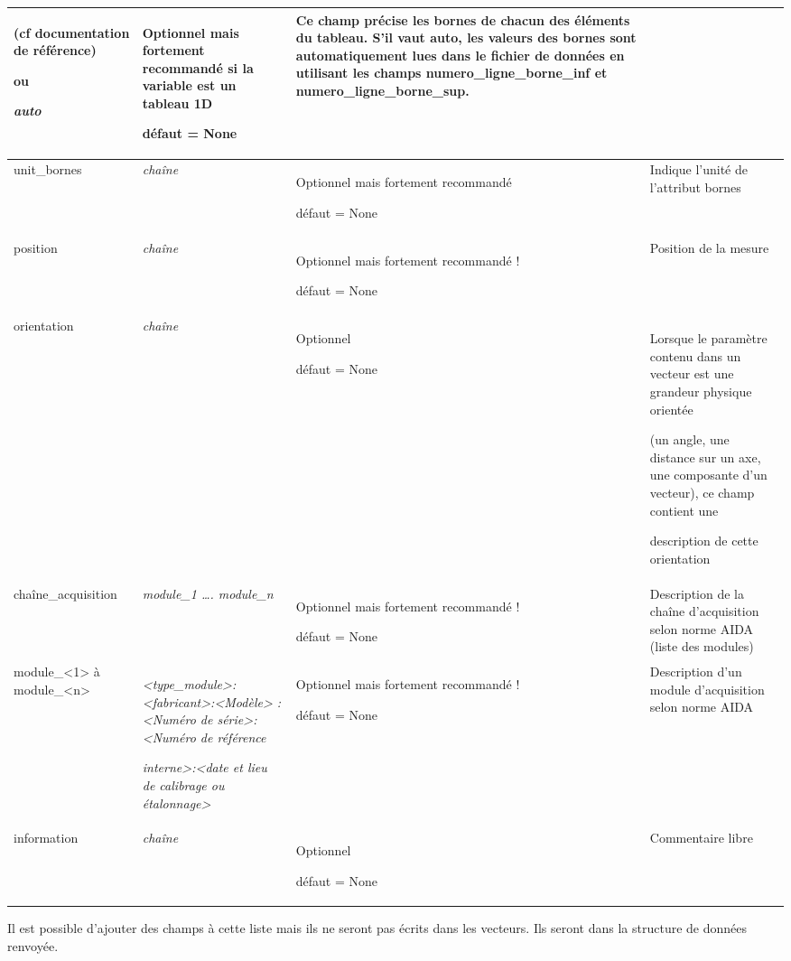 {\begin{center}
\begin{supertabular}{|p{2.9099998cm}|p{3.783cm}|p{4.058cm}|p{4.4500003cm}|}
(cf documentation de référence)

ou

{\itshape auto}&
Optionnel mais fortement recommandé si la variable est un tableau 1D

défaut = None &
Ce champ précise les bornes de chacun des éléments du tableau. S'il vaut auto, les valeurs des bornes sont automatiquement lues dans le fichier de données en utilisant les champs numero\_ligne\_borne\_inf et numero\_ligne\_borne\_sup.\\\hline
unit\_bornes &
{\itshape chaîne} &
Optionnel mais fortement recommandé

défaut = None &
Indique l'unité de l'attribut bornes\\\hline
position &
{\itshape chaîne} &
Optionnel mais fortement recommandé !

défaut = None &
Position de la mesure\\\hline
orientation &
{\itshape chaîne} &
Optionnel

défaut = None &
Lorsque le paramètre contenu dans un vecteur est une grandeur physique orientée

(un angle, une distance sur un axe, une composante d'un vecteur), ce champ contient une

description de cette orientation\\\hline
chaîne\_acquisition &
\textit{module\_1 {\dots}. module\_n} &
Optionnel mais fortement recommandé !

défaut = None &
Description de la chaîne d'acquisition selon norme AIDA (liste des modules)\\\hline
module\_{\textless}1{\textgreater} à module\_{\textless}n{\textgreater} &
{\itshape {\textless}type\_module{\textgreater}:{\textless}fabricant{\textgreater}:{\textless}Modèle{\textgreater}
:{\textless}Numéro de série{\textgreater}:{\textless}Numéro de référence}

{\itshape interne{\textgreater}:{\textless}date et lieu de calibrage ou étalonnage{\textgreater}} &
Optionnel mais fortement recommandé !

défaut = None &
Description d{}'un module d'acquisition selon norme AIDA\\\hline
information &
{\itshape chaîne } &
Optionnel

défaut = None &
Commentaire libre\\\hline
\end{supertabular}
\end{center}

\medskip
{\color{black}
Il est possible d'ajouter des champs à cette liste mais ils ne seront pas écrits dans les vecteurs. Ils seront dans la
structure de données renvoyée.}

}
